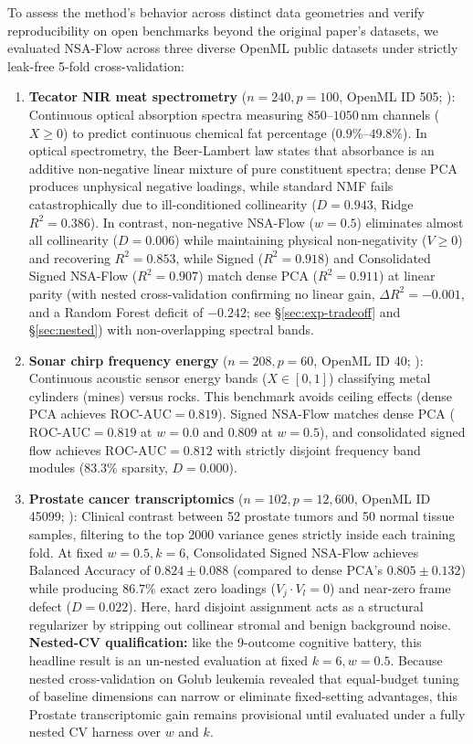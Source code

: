 \documentclass[11pt]{article}
\theoremstyle{definition}
\begin{document}
To assess the method's behavior across distinct data geometries and verify reproducibility on open benchmarks beyond the original paper's datasets, we evaluated NSA-Flow across three diverse OpenML public datasets under strictly leak-free 5-fold cross-validation:
\begin{enumerate}\itemsep1pt
  \item \textbf{Tecator NIR meat spectrometry} ($n=240, p=100$, OpenML ID 505; \citealt{borggaard1992optimal}): Continuous optical absorption spectra measuring $850$--$1050$\,nm channels ($X \ge 0$) to predict continuous chemical fat percentage ($0.9\%$--$49.8\%$). In optical spectrometry, the Beer-Lambert law states that absorbance is an additive non-negative linear mixture of pure constituent spectra; dense PCA produces unphysical negative loadings, while standard NMF fails catastrophically due to ill-conditioned collinearity ($D = 0.943$, Ridge $R^2 = 0.386$). In contrast, non-negative NSA-Flow ($w=0.5$) eliminates almost all collinearity ($D = 0.006$) while maintaining physical non-negativity ($V \ge 0$) and recovering $R^2 = 0.853$, while Signed ($R^2 = 0.918$) and Consolidated Signed NSA-Flow ($R^2 = 0.907$) match dense PCA ($R^2 = 0.911$) at linear parity (with nested cross-validation confirming no linear gain, $\Delta R^2 = -0.001$, and a Random Forest deficit of $-0.242$; see \S\ref{sec:exp-tradeoff} and \S\ref{sec:nested}) with non-overlapping spectral bands.
  \item \textbf{Sonar chirp frequency energy} ($n=208, p=60$, OpenML ID 40; \citealt{gorman1988analysis}): Continuous acoustic sensor energy bands ($X \in [0, 1]$) classifying metal cylinders (mines) versus rocks. This benchmark avoids ceiling effects (dense PCA achieves $\text{ROC-AUC} = 0.819$). Signed NSA-Flow matches dense PCA ($\text{ROC-AUC} = 0.819$ at $w=0.0$ and $0.809$ at $w=0.5$), and consolidated signed flow achieves $\text{ROC-AUC} = 0.812$ with strictly disjoint frequency band modules ($83.3\%$ sparsity, $D = 0.000$).
  \item \textbf{Prostate cancer transcriptomics} ($n=102, p=12{,}600$, OpenML ID 45099; \citealt{singh2002gene}): Clinical contrast between 52 prostate tumors and 50 normal tissue samples, filtering to the top 2000 variance genes strictly inside each training fold. At fixed $w=0.5, k=6$, Consolidated Signed NSA-Flow achieves Balanced Accuracy of $0.824 \pm 0.088$ (compared to dense PCA's $0.805 \pm 0.132$) while producing $86.7\%$ exact zero loadings ($V_j \cdot V_l = 0$) and near-zero frame defect ($D = 0.022$). Here, hard disjoint assignment acts as a structural regularizer by stripping out collinear stromal and benign background noise. \textbf{Nested-CV qualification:} like the 9-outcome cognitive battery, this headline result is an un-nested evaluation at fixed $k=6, w=0.5$. Because nested cross-validation on Golub leukemia revealed that equal-budget tuning of baseline dimensions can narrow or eliminate fixed-setting advantages, this Prostate transcriptomic gain remains provisional until evaluated under a fully nested CV harness over $w$ and $k$.
\end{enumerate}
\end{document}
